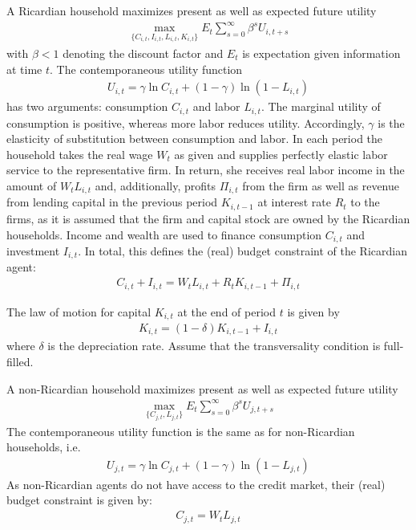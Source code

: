 \documentclass{article}
\begin{document}
A Ricardian household maximizes present as well as expected future utility
\begin{align*}
\underset{\{C_{i,t},I_{i,t},L_{i,t},K_{i,t}\}}{\max} E_t \sum_{s=0}^{\infty} \beta^{s} U_{i,t+s}
\end{align*}
with $\beta <1$ denoting the discount factor and $E_t$ is expectation given information at time $t$. The contemporaneous utility function 
\begin{align*}
U_{i,t} = \gamma \ln C_{i,t} + (1-\gamma) \ln{(1-L_{i,t})}
\end{align*}
has two arguments: consumption $C_{i,t}$ and labor $L_{i,t}$. The marginal utility of consumption is positive, whereas more labor reduces utility. Accordingly, $\gamma$ is the elasticity of substitution between consumption and labor. In each period the household takes the real wage $W_t$ as given and supplies perfectly elastic labor service to the representative firm. In return, she receives real labor income in the amount of $W_t L_{i,t}$ and, additionally, profits $\Pi_{i,t}$ from the firm as well as revenue from lending capital in the previous period $K_{i,t-1}$ at interest rate $R_t$ to the firms, as it is assumed that the firm and capital stock are owned by the Ricardian households. Income and wealth are used to finance consumption $C_{i,t}$ and investment $I_{i,t}$. In total, this defines the (real) budget constraint of the Ricardian agent:
\begin{align*}
C_{i,t} + I_{i,t} = W_t L_{i,t} + R_t K_{i,t-1} + \Pi_{i,t}
\end{align*}

The law of motion for capital $K_{i,t}$ at the end of period $t$ is given by
\begin{align*}
K_{i,t} = (1-\delta)K_{i,t-1} + I_{i,t}
\end{align*}
where $\delta$ is the depreciation rate. Assume that the transversality condition is full-filled.

A non-Ricardian household maximizes present as well as expected future utility
\begin{align*}
\underset{\{C_{j,t},L_{j,t}\}}{\max} E_t \sum_{s=0}^{\infty} \beta^{s} U_{j,t+s}
\end{align*}
The contemporaneous utility function is the same as for non-Ricardian households, i.e.
\begin{align*}
U_{j,t} = \gamma \ln C_{j,t} + (1-\gamma) \ln{(1-L_{j,t})}
\end{align*}
As non-Ricardian agents do not have access to the credit market, their (real) budget constraint is given by:
\begin{align*}
C_{j,t} = W_t L_{j,t}
\end{align*}
\end{document}
